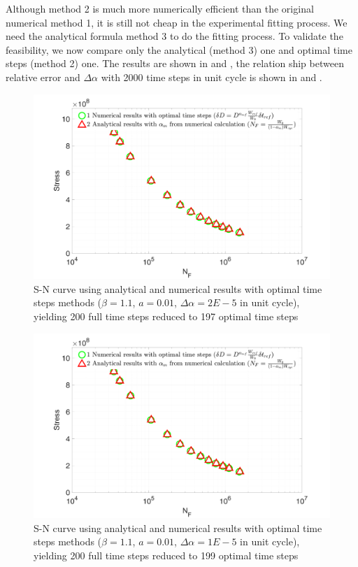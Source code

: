Although method 2 is much more numerically efficient than the original numerical method 1, it is still not cheap in the experimental fitting process. We need the analytical formula method 3 to do the fitting process. To validate the feasibility, we now compare only the analytical (method 3) one and optimal time steps (method 2) one. The results are shown in  and , the relation ship between relative error and $\Delta \alpha$ with 2000 time steps in unit cycle is shown in   and .
\begin{figure}[!h]
	\centering
	\includegraphics[width=\textwidth]{figures//SN_opt_ana_200_delta_alp=0.00002.png} 
	\caption{S-N curve using analytical and numerical results with optimal time steps methods ($\beta=1.1$, $a=0.01$, $\Delta \alpha=2E-5$ in unit cycle), yielding 200 full time steps reduced to 197 optimal time steps}
	\label{fig.SNnumerical2methods}
\end{figure}
\begin{figure}[!h]
	\centering
	\includegraphics[width=\textwidth]{figures//SN_opt_ana_200_delta_alp=0.00001.png} 
	\caption{S-N curve using analytical and numerical results with optimal time steps methods ($\beta=1.1$, $a=0.01$, $\Delta \alpha=1E-5$ in unit cycle), yielding 200 full time steps reduced to 199 optimal time steps}
	\label{fig.SNnumerical2methods2}
\end{figure}
